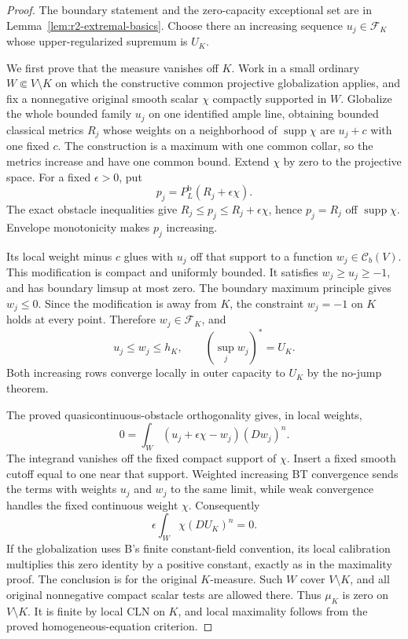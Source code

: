 \documentclass[11pt,a4paper]{article}
\numberwithin{equation}{section}
\theoremstyle{definition}
\theoremstyle{remark}
\newcommand{\Cb}{\mathcal C_b}
\begin{document}
\begin{proof}
The boundary statement and the zero-capacity exceptional set
are in Lemma~\ref{lem:r2-extremal-basics}. Choose there an
increasing sequence $u_j\in\mathcal F_K$ whose upper-regularized
supremum is $U_K$.

We first prove that the measure vanishes off $K$.
Work in a small ordinary $W\Subset V\setminus K$ on which
the constructive common projective globalization applies,
and fix a nonnegative original smooth scalar $\chi$ compactly
supported in $W$. Globalize the whole bounded family $u_j$
on one identified ample line, obtaining bounded classical
metrics $R_j$ whose weights on a neighborhood of
$\operatorname{supp}\chi$ are $u_j+c$ with one fixed $c$.
The construction is a maximum with one common collar, so
the metrics increase and have one common bound.
Extend $\chi$ by zero to the projective space. For a fixed
$\epsilon>0$, put
\[
 p_j=P_L^{\mathrm b}(R_j+\epsilon\chi).
\]
The exact obstacle inequalities give
$R_j\leq p_j\leq R_j+\epsilon\chi$, hence $p_j=R_j$
off $\operatorname{supp}\chi$. Envelope monotonicity makes
$p_j$ increasing.

Its local weight minus $c$ glues with $u_j$ off that support
to a function $w_j\in\Cb(V)$. This modification is compact
and uniformly bounded. It satisfies $w_j\geq u_j\geq-1$,
and has boundary limsup at most zero. The boundary maximum
principle gives $w_j\leq0$. Since the modification is away
from $K$, the constraint $w_j=-1$ on $K$ holds at every
point. Therefore $w_j\in\mathcal F_K$, and
\[
 u_j\leq w_j\leq h_K,\qquad
 \left(\sup_jw_j\right)^*=U_K.
\]
Both increasing rows converge locally in outer capacity
to $U_K$ by the no-jump theorem.

The proved quasicontinuous-obstacle orthogonality gives,
in local weights,
\[
 0=\int_W(u_j+\epsilon\chi-w_j)(Dw_j)^n .
\]
The integrand vanishes off the fixed compact support of
$\chi$. Insert a fixed smooth cutoff equal to one near
that support. Weighted increasing BT convergence sends
the terms with weights $u_j$ and $w_j$ to the same limit,
while weak convergence handles the fixed continuous
weight $\chi$. Consequently
\[
 \epsilon\int_W\chi(DU_K)^n=0.
\]
If the globalization uses B's finite constant-field
convention, its local calibration multiplies this zero
identity by a positive constant, exactly as in the
maximality proof. The conclusion is for the original
$K$-measure. Such $W$ cover $V\setminus K$, and all original
nonnegative compact scalar tests are allowed there.
Thus $\mu_K$ is zero on $V\setminus K$.
It is finite by local CLN on $K$, and local maximality
follows from the proved homogeneous-equation criterion.


\end{proof}
\end{document}

